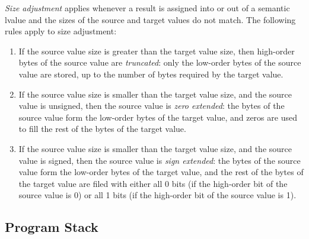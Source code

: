 \documentclass[10pt]{article}
\begin{document}
\emph{Size adjustment} applies whenever a result is assigned into or
out of a semantic lvalue and the sizes of the source and target values
do not match.  The following rules apply to size adjustment:
%
\begin{enumerate}
%
\item If the source value size is greater than the target value size,
  then high-order bytes of the source value are \emph{truncated}: only
  the low-order bytes of the source value are stored, up to the number
  of bytes required by the target value.
%
\item If the source value size is smaller than the target value size,
  and the source value is unsigned, then the source value is
  \emph{zero extended}:  the bytes of the source value form the
  low-order bytes of the target value, and zeros are used to fill the
  rest of the bytes of the target value.
%
\item If the source value size is smaller than the target value size,
  and the source value is signed, then the source value is \emph{sign
    extended}: the bytes of the source value form the low-order bytes
  of the target value, and the rest of the bytes of the target value
  are filed with either all 0 bits (if the high-order bit of the
  source value is 0) or all 1 bits (if the high-order bit of the
  source value is 1).
%
\end{enumerate}

\subsection{Program Stack}
\label{sec:code-gen:program-stack}
\end{document}
